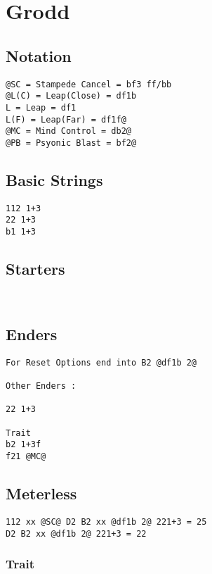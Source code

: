 \documentclass[main.tex]{subfiles}
\begin{document}
\chapter{Grodd}

\section{Notation}
\begin{lstlisting}[language=FG]
@SC = Stampede Cancel = bf3 ff/bb
@L(C) = Leap(Close) = df1b
L = Leap = df1
L(F) = Leap(Far) = df1f@
@MC = Mind Control = db2@
@PB = Psyonic Blast = bf2@
\end{lstlisting}


\section{Basic Strings}

\begin{lstlisting}[language=FG]
112 1+3
22 1+3
b1 1+3
\end{lstlisting}

\section{Starters}
\begin{lstlisting}[language=FG]


\end{lstlisting}

\section{Enders}

\begin{lstlisting}[language=FG]
For Reset Options end into B2 @df1b 2@ 

Other Enders :

22 1+3

Trait
b2 1+3f
f21 @MC@
\end{lstlisting}

\section{Meterless}


\begin{lstlisting}[language=FG]
112 xx @SC@ D2 B2 xx @df1b 2@ 221+3 = 25
D2 B2 xx @df1b 2@ 221+3 = 22
\end{lstlisting}

\subsection{Trait}
\end{document}

